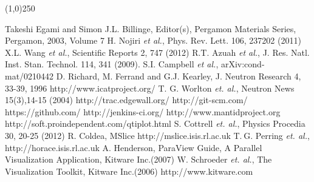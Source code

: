 \documentclass{elsarticle}
\begin{document}
\begin{center}
\line(1,0){250}
\end{center}


\begin{thebibliography}{00}
 Takeshi Egami and Simon J.L. Billinge, Editor(s), Pergamon Materials Series, Pergamon, 2003, Volume 7
 H. Nojiri {\it et al.}, Phys. Rev. Lett. 106, 237202 (2011)
 X.L. Wang {\it et al.}, Scientific Reports 2, 747 (2012)
  R.T. Azuah {\it et al.}, J. Res. Natl. Inst. Stan. Technol. 114, 341 (2009).
 S.I. Campbell {\it et al.}, arXiv:cond-mat/0210442
 D. Richard, M. Ferrand and G.J. Kearley, J. Neutron Research 4, 33-39, 1996
 http://www.icatproject.org/
 T. G. Worlton {\it et. al.}, Neutron News 15(3),14-15 (2004)  
 http://trac.edgewall.org/
 http://git-scm.com/
 https://github.com/
 http://jenkins-ci.org/
 http://www.mantidproject.org
 http://soft.proindependent.com/qtiplot.html
 S. Cottrell {\it et. al.}, Physics Procedia 30, 20-25 (2012)
 R. Coldea, MSlice  http://mslice.isis.rl.ac.uk
 T. G. Perring {\it et. al.}, http://horace.isis.rl.ac.uk
 A. Henderson, ParaView Guide, A Parallel Visualization Application, Kitware Inc.(2007)
 W. Schroeder {\it et. al.}, The Visualization Toolkit, Kitware Inc.(2006)
 http://www.kitware.com

\end{thebibliography}
\end{document}
